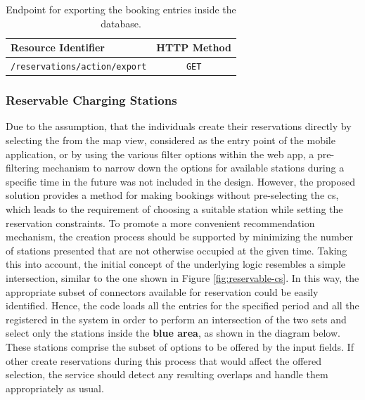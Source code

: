 \begingroup
\setlength{\tabcolsep}{10pt} %
\renewcommand{\arraystretch}{1.5} %
\begin{table}[h]
\centering
\caption{Endpoint for exporting the booking entries inside the database.}
    \begin{tabular}{l|c}
    Resource Identifier & HTTP Method \\ \hline
    \texttt{/reservations/action/export} & \texttt{GET}
    \end{tabular}
\label{tab:export-reservation-rest}
\end{table}
\endgroup

\subsubsection{Reservable Charging Stations}
\label{ch:Implementation:sec:Reservation System:ssec:Additional Capabilities:sssec:Reservable Charging Stations}

Due to the assumption, that the individuals create their reservations directly by selecting the  from the map view, considered as the entry point of the mobile application, or by using the various filter options within the web app, a pre-filtering mechanism to narrow down the options for available stations during a specific time in the future was not included in the design.
However, the proposed solution provides a method for making bookings without pre-selecting the \acrshort{cs}, which leads to the requirement of choosing a suitable station while setting the reservation constraints. To promote a more convenient recommendation mechanism, the creation process should be supported by minimizing the number of stations presented that are not otherwise occupied at the given time.
Taking this into account, the initial concept of the underlying logic resembles a simple intersection, similar to the one shown in Figure \ref{fig:reservable-cs}. In this way, the appropriate subset of connectors available for reservation could be easily identified.
Hence, the code loads all the entries for the specified period and all the  registered in the system in order to perform an intersection of the two sets and select only the stations inside the \textbf{blue area}, as shown in the diagram below. These stations comprise the subset of options to be offered by the input fields.
If other  create reservations during this process that would affect the offered selection, the service should detect any resulting overlaps and handle them appropriately as usual.

